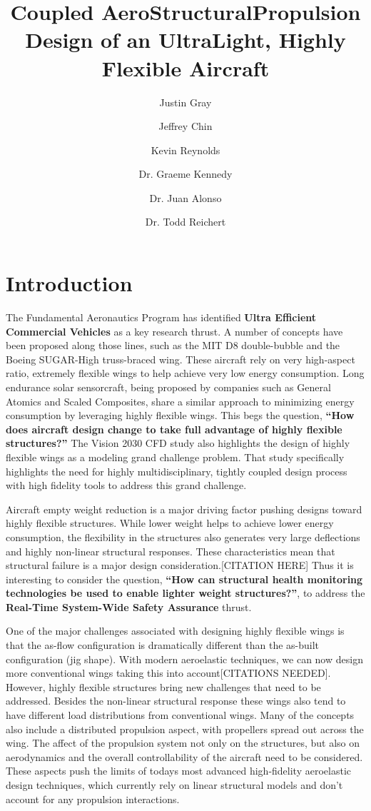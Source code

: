 \documentclass[]{aiaa-tc}
\title{Coupled Aero­Structural­Propulsion Design of an Ultra­Light, Highly Flexible Aircraft}
\author[1]{Justin Gray}
\author[1]{Jeffrey Chin}
\author[2]{Kevin Reynolds}
\author[3]{Dr. Graeme Kennedy}
\author[4]{Dr. Juan Alonso}
\author[4]{Dr. Todd Reichert}
\affil[1]{Aerospace Engineer, NASA Glenn Research Center - LTA Branch}
\affil[2]{Aerospace Engineer, NASA Ames Research Center - ??? Branch}
\affil[3]{Assistant Professor, Georgia Institute of Technology, School of Aerospace Engineering}
\affil[4]{Associate Professor, Stanford University, Department of Aeronautics and Astronautics}
\affil[5]{Vice President of Aerodynamics, AeroVelo Inc.}
\begin{document}
  \maketitle

  \section{Introduction}

    The Fundamental Aeronautics Program has identified \textbf{Ultra Efficient Commercial Vehicles} as 
    a key research thrust. A number of concepts have been proposed along those lines, such as 
    the MIT D8 double­-bubble and the Boeing SUGAR­-High truss­-braced wing. These aircraft rely on 
    very high­-aspect ratio, extremely flexible wings to help achieve very low energy consumption. 
    Long endurance solar sensorcraft, being proposed by companies such as General Atomics and 
    Scaled Composites, share a similar approach to minimizing energy consumption by leveraging highly 
    flexible wings. This begs the question, \textbf{``How does aircraft design change to take full 
    advantage of highly flexible structures?''} The Vision 2030 CFD study also highlights the 
    design of highly flexible wings as a modeling grand challenge problem. That study specifically 
    highlights the need for highly multidisciplinary, tightly coupled design process with high 
    fidelity tools to address this grand challenge.

    Aircraft empty weight reduction is a major driving factor pushing designs toward highly flexible structures. 
    While lower weight helps to achieve lower energy consumption, the flexibility in the structures also 
    generates very large deflections and highly non-linear structural responses. These characteristics mean that 
    structural failure is a major design consideration.[CITATION HERE] Thus it is interesting to consider the question, 
    \textbf{``How can structural health monitoring technologies be used to enable lighter 
    weight structures?''}, to address the \textbf{Real­-Time System­-Wide Safety Assurance} thrust. 

    One of the major challenges associated with designing highly flexible wings is that the as-flow configuration 
    is dramatically different than the as-built configuration (jig shape). With modern aeroelastic techniques, 
    we can now design more conventional wings taking this into account[CITATIONS NEEDED]. However, highly flexible
    structures bring new challenges that need to be addressed. Besides the non-linear structural 
    response these wings also tend to have different load distributions from conventional wings. Many of the concepts 
    also include a distributed propulsion aspect, with propellers spread out across the wing. The affect of the 
    propulsion system not only on the structures, but also on aerodynamics and the overall controllability 
    of the aircraft need to be considered. These aspects push the 
    limits of todays most advanced high-fidelity aeroelastic design techniques, which currently rely on linear structural 
    models and don't account for any propulsion interactions. 
\end{document}
